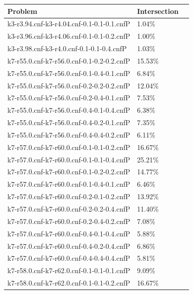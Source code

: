 \documentclass[12pt,a4paper,twoside]{scrartcl}
\numberwithin{equation}{section}
\begin{document}
\begin{table}[H]
\label{tab:combine big} 
\begin{center}
    \begin{tabular}{|l|l|p{1cm}|}
\hline 
Problem &Intersection \\ \hline
k3-r3.94.cnf-k3-r4.04.cnf-0.1-0.1-0.1.cnfP&	1.04\%\\  \hline
k3-r3.96.cnf-k3-r4.06.cnf-0.1-0.1-0.2.cnfP&	1.00\%\\  \hline
k3-r3.98.cnf-k3-r4.0.cnf-0.1-0.1-0.4.cnfP&	1.03\%\\  \hline
k7-r55.0.cnf-k7-r56.0.cnf-0.1-0.2-0.2.cnfP&	15.53\%\\  \hline
k7-r55.0.cnf-k7-r56.0.cnf-0.1-0.4-0.1.cnfP&	6.84\%\\  \hline
k7-r55.0.cnf-k7-r56.0.cnf-0.2-0.2-0.2.cnfP&	12.04\%\\  \hline
k7-r55.0.cnf-k7-r56.0.cnf-0.2-0.4-0.1.cnfP&	7.53\%\\  \hline
k7-r55.0.cnf-k7-r56.0.cnf-0.4-0.1-0.4.cnfP&	6.38\%\\  \hline
k7-r55.0.cnf-k7-r56.0.cnf-0.4-0.2-0.1.cnfP&	7.35\%\\  \hline
k7-r55.0.cnf-k7-r56.0.cnf-0.4-0.4-0.2.cnfP&	6.11\%\\  \hline
k7-r57.0.cnf-k7-r60.0.cnf-0.1-0.1-0.2.cnfP&	16.67\%\\  \hline
k7-r57.0.cnf-k7-r60.0.cnf-0.1-0.1-0.4.cnfP&	25.21\%\\  \hline
k7-r57.0.cnf-k7-r60.0.cnf-0.1-0.2-0.2.cnfP&	14.77\%\\  \hline
k7-r57.0.cnf-k7-r60.0.cnf-0.1-0.4-0.1.cnfP&	6.46\%\\  \hline
k7-r57.0.cnf-k7-r60.0.cnf-0.2-0.1-0.2.cnfP&	13.92\%\\  \hline
k7-r57.0.cnf-k7-r60.0.cnf-0.2-0.2-0.4.cnfP&	11.40\%\\  \hline
k7-r57.0.cnf-k7-r60.0.cnf-0.2-0.4-0.2.cnfP&	7.08\%\\  \hline
k7-r57.0.cnf-k7-r60.0.cnf-0.4-0.1-0.4.cnfP&	5.88\%\\  \hline
k7-r57.0.cnf-k7-r60.0.cnf-0.4-0.2-0.4.cnfP&	6.86\%\\  \hline
k7-r57.0.cnf-k7-r60.0.cnf-0.4-0.4-0.4.cnfP&	5.81\%\\  \hline
k7-r58.0.cnf-k7-r62.0.cnf-0.1-0.1-0.1.cnfP&	9.09\%\\  \hline
k7-r58.0.cnf-k7-r62.0.cnf-0.1-0.1-0.2.cnfP&	16.67\%\\  \hline

\end{tabular}
\end{center}
\end{table}
\end{document}
